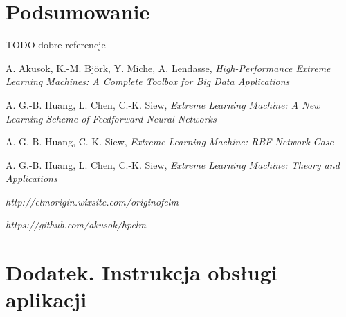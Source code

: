 \documentclass{article}
\begin{document}
\section*{Podsumowanie}

\clearpage
{}

TODO dobre referencje
\begin{thebibliography}{9}
  A. Akusok, K.-M. Björk, Y. Miche, A. Lendasse,
  \emph{High-Performance Extreme Learning Machines: A Complete Toolbox for Big Data Applications}


  A. G.-B. Huang, L. Chen, C.-K. Siew, 
  \emph{Extreme Learning Machine: A New Learning Scheme of Feedforward Neural Networks}
  
  A. G.-B. Huang, C.-K. Siew, 
  \emph{Extreme Learning Machine: RBF Network Case} 

  A. G.-B. Huang, L. Chen, C.-K. Siew, 
  \emph{Extreme Learning Machine: Theory and Applications} 
  
  \emph{http://elmorigin.wixsite.com/originofelm}  
  
  \emph{https://github.com/akusok/hpelm}  
\end{thebibliography}

\clearpage
{}
\listoffigures
\clearpage
{}
\listoftables
\clearpage
\section*{Dodatek. Instrukcja obsługi aplikacji}

\clearpage
\end{document}
